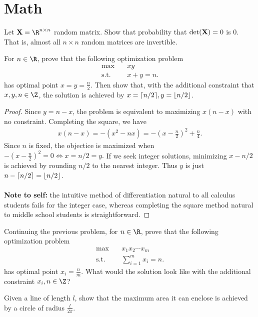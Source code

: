 \section{Math}

\begin{problembox}{}{}
Let $\bX = \R^{n \times n}$ random matrix. Show that probability that $\det(\mathbf{X}) = 0$ is $0$. That is, almost all $n \times n$ random matrices are invertible. 
\end{problembox}

\begin{problembox}{}{}
For $n \in \R$, prove that the following optimization problem
\begin{align*}
	\max &\quad xy\\
	\text{s.t.} & \quad x + y = n.
\end{align*}
has optimal point $x = y = \frac{n}{2}$. Then show that, with the additional constraint that $x, y, n \in \Z$, the solution is achieved by $x = \lceil n/2\rceil, y = \lfloor n/2\rfloor$. 
\end{problembox}

\begin{proof}
Since $y = n - x$, the problem is equivalent to maximizing $x(n - x)$ with no constraint. Completing the square, we have
\begin{align*}
	x(n - x) = -(x^2 - nx) = -\left(x - \frac{n}{2}\right)^2 + \frac{n}{4}.
\end{align*}
Since $n$ is fixed, the objectice is maximized when $-\left(x - \frac{n}{2}\right)^2 = 0 \iff x = n / 2 = y.$ If we seek integer solutions, minimizing $x - n/2$ is achieved by rounding $n/2$ to the nearest integer. Thus $y$ is just $n - \lceil n / 2\rceil = \lfloor n/2\rfloor$. \\
\\
\textbf{Note to self:} the intuitive method of differentiation natural to all calculus students fails for the integer case, whereas completing the square method natural to middle school students is straightforward. 
\end{proof}

\begin{problembox}{}{}
Continuing the previous problem, for $n \in \R$, prove that the following optimization problem
\begin{align*}
	\max &\quad x_1 x_2 \cdots x_m\\
	\text{s.t.} & \quad \sum_{i=1}^m x_i = n.
\end{align*}
has optimal point $x_i = \frac{n}{m}$. What would the solution look like with the additional constraint $x_i, n \in \Z$? 
\end{problembox}

\begin{problembox}{}{}
Given a line of length $l$, show that the maximum area it can enclose is achieved by a circle of radius $\frac{l}{2\pi}.$
\end{problembox}